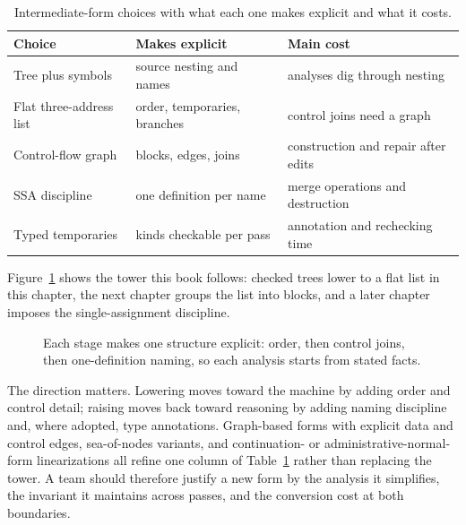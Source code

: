 \begin{table}
\caption{Intermediate-form choices with what each one makes explicit and what it costs.}
\label{tab:ch06-ir-choices}
\centering
\begin{tabular}{lll}
\toprule
Choice & Makes explicit & Main cost \\
\midrule
Tree plus symbols & source nesting and names & analyses dig through nesting \\
Flat three-address list & order, temporaries, branches & control joins need a graph \\
Control-flow graph & blocks, edges, joins & construction and repair after edits \\
SSA discipline & one definition per name & merge operations and destruction \\
Typed temporaries & kinds checkable per pass & annotation and rechecking time \\
\bottomrule
\end{tabular}
\end{table}
Figure~\ref{fig:ch06-ir-tower} shows the tower this book follows: checked trees lower to a flat list in this chapter, the next chapter groups the list into blocks, and a later chapter imposes the single-assignment discipline.
\begin{figure}
\centering
{}
\caption{Each stage makes one structure explicit: order, then control joins, then one-definition naming, so each analysis starts from stated facts.}
\label{fig:ch06-ir-tower}
\end{figure}
The direction matters.
Lowering moves toward the machine by adding order and control detail; raising moves back toward reasoning by adding naming discipline and, where adopted, type annotations.
Graph-based forms with explicit data and control edges, sea-of-nodes variants, and continuation- or administrative-normal-form linearizations all refine one column of Table~\ref{tab:ch06-ir-choices} rather than replacing the tower.
A team should therefore justify a new form by the analysis it simplifies, the invariant it maintains across passes, and the conversion cost at both boundaries.

